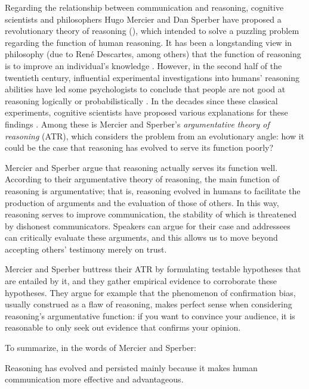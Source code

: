 
Regarding the relationship between communication and reasoning, cognitive scientists and philosophers Hugo Mercier and Dan Sperber have proposed a revolutionary theory of reasoning (\citeyear{MS11}), which intended to solve a puzzling problem regarding the function of human reasoning.
It has been a longstanding view in philosophy (due to René Descartes, among others) that the function of reasoning is to improve an individual's knowledge \citep{Schouls72, Walter51}.
However, in the second half of the twentieth century, influential experimental investigations into humans' reasoning abilities have led some psychologists to conclude that people are not good at reasoning logically \citep{Wason68} or probabilistically \citep{Tversky83}.
In the decades since these classical experiments, cognitive scientists have proposed various explanations for these findings \citep[e.g.][]{Cosmides89, Oaksford94, Hertwig99}.
Among these is Mercier and Sperber's \emph{argumentative theory of reasoning} (ATR), which considers the problem from an evolutionary angle: how it could be the case that reasoning has evolved to serve its function poorly?

Mercier and Sperber argue that reasoning actually serves its function well.
According to their argumentative theory of reasoning, the main function of reasoning is argumentative; that is, reasoning evolved in humans to facilitate the production of arguments and the evaluation of those of others. In this way, reasoning serves to improve communication, the stability of which is threatened by dishonest communicators. Speakers can argue for their case and addressees can critically evaluate these arguments, and this allows us to move beyond accepting others' testimony merely on trust.

Mercier and Sperber buttress their ATR by formulating testable hypotheses that are entailed by it, and they gather empirical evidence to corroborate these hypotheses. They argue for example that the phenomenon of confirmation bias, usually construed as a flaw of reasoning, makes perfect sense when considering reasoning's argumentative function: if you want to convince your audience, it is reasonable to only seek out evidence that confirms your opinion.

To summarize, in the words of Mercier and Sperber:
\begin{quoting}
    Reasoning has evolved and persisted mainly because it makes human communication more effective and advantageous.
    \\ \hspace*{\fill} \citep[p.~60]{MS11}
\end{quoting}

